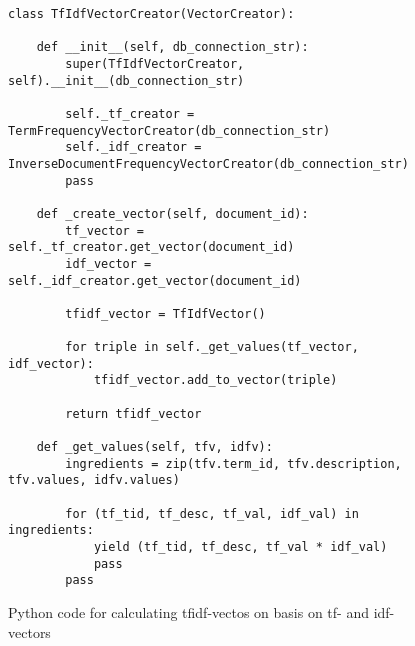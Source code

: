 \begin{figure}[h]
    \lstset{language=Python}
    \begin{lstlisting}
class TfIdfVectorCreator(VectorCreator):
    
    def __init__(self, db_connection_str):
        super(TfIdfVectorCreator, self).__init__(db_connection_str)

        self._tf_creator = TermFrequencyVectorCreator(db_connection_str)
        self._idf_creator = InverseDocumentFrequencyVectorCreator(db_connection_str)
        pass

    def _create_vector(self, document_id):
        tf_vector = self._tf_creator.get_vector(document_id)
        idf_vector = self._idf_creator.get_vector(document_id)

        tfidf_vector = TfIdfVector()

        for triple in self._get_values(tf_vector, idf_vector):
            tfidf_vector.add_to_vector(triple)

        return tfidf_vector

    def _get_values(self, tfv, idfv):
        ingredients = zip(tfv.term_id, tfv.description, tfv.values, idfv.values)

        for (tf_tid, tf_desc, tf_val, idf_val) in ingredients:
            yield (tf_tid, tf_desc, tf_val * idf_val)
            pass
        pass
    \end{lstlisting}
    \caption{Python code for calculating tfidf-vectos on basis on tf- and idf-vectors}
    \label{fig:tfidf-code}
\end{figure}

